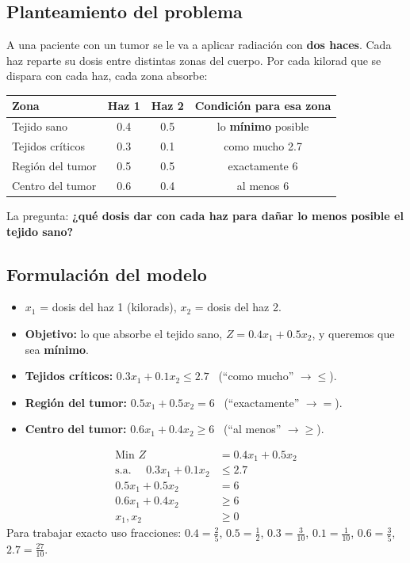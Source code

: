 \documentclass[11pt,a4paper]{article}
\begin{document}
\subsection*{Planteamiento del problema}
A una paciente con un tumor se le va a aplicar radiación con \textbf{dos haces}. Cada haz reparte su dosis entre
distintas zonas del cuerpo. Por cada kilorad que se dispara con cada haz, cada zona absorbe:

\begin{center}
\begin{tabular}{lccc}
\toprule
\textbf{Zona} & \textbf{Haz 1} & \textbf{Haz 2} & \textbf{Condición para esa zona} \\
\midrule
Tejido sano         & 0.4 & 0.5 & lo \textbf{mínimo} posible \\
Tejidos críticos    & 0.3 & 0.1 & como mucho 2.7 \\
Región del tumor    & 0.5 & 0.5 & exactamente 6 \\
Centro del tumor    & 0.6 & 0.4 & al menos 6 \\
\bottomrule
\end{tabular}
\end{center}

La pregunta: \textbf{¿qué dosis dar con cada haz para dañar lo menos posible el tejido sano?}

\subsection*{Formulación del modelo}
\begin{itemize}[itemsep=2pt]
  \item $x_1$ = dosis del haz 1 (kilorads), \quad $x_2$ = dosis del haz 2.
  \item \textbf{Objetivo:} lo que absorbe el tejido sano, $Z = 0.4x_1 + 0.5x_2$, y queremos que sea \textbf{mínimo}.
  \item \textbf{Tejidos críticos:} $0.3x_1 + 0.1x_2 \le 2.7$ \ (``como mucho'' $\to \le$).
  \item \textbf{Región del tumor:} $0.5x_1 + 0.5x_2 = 6$ \ (``exactamente'' $\to =$).
  \item \textbf{Centro del tumor:} $0.6x_1 + 0.4x_2 \ge 6$ \ (``al menos'' $\to \ge$).
\end{itemize}

\[
\begin{aligned}
\text{Min } Z &= 0.4x_1 + 0.5x_2\\
\text{s.a. } \quad 0.3x_1 + 0.1x_2 &\le 2.7\\
0.5x_1 + 0.5x_2 &= 6\\
0.6x_1 + 0.4x_2 &\ge 6\\
x_1, x_2 &\ge 0
\end{aligned}
\]
Para trabajar exacto uso fracciones: $0.4 = \tfrac25$, $0.5 = \tfrac12$, $0.3 = \tfrac{3}{10}$, $0.1 = \tfrac1{10}$,
$0.6 = \tfrac35$, $2.7 = \tfrac{27}{10}$.
\end{document}
